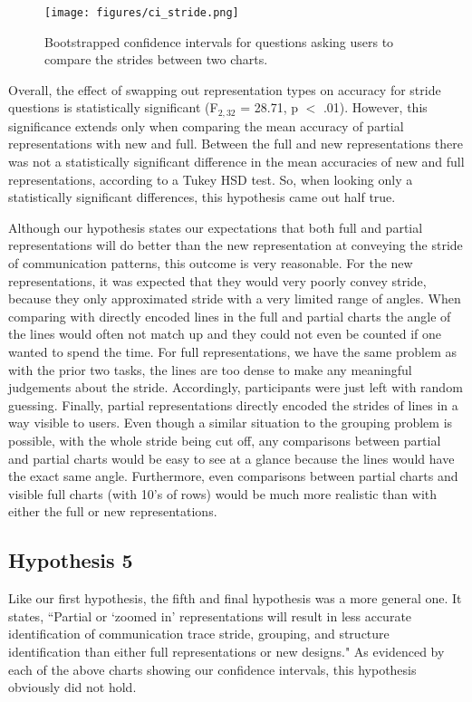     \begin{figure}
        \centering
        \texttt{[image: figures/ci\_stride.png]}
        \caption{Bootstrapped confidence intervals for questions asking users to compare the strides between two charts.}
        \label{fig:ci_stride}
    \end{figure}

    Overall, the effect of swapping out representation types on accuracy for stride questions is statistically significant (F$_{2,32}$ = 28.71, p $<$ .01). However, this significance extends only when comparing the mean accuracy of partial representations with new and full. Between the full and new representations there was not a statistically significant difference in the mean accuracies of new and full representations, according to a Tukey HSD test. So, when looking only a statistically significant differences, this hypothesis came out half true.
    
    Although our hypothesis states our expectations that both full and partial representations will do better than the new representation at conveying the stride of communication patterns, this outcome is very reasonable. For the new representations, it was expected that they would very poorly convey stride, because they only approximated stride with a very limited range of angles.  When comparing with directly encoded lines in the full and partial charts the angle of the lines would often not match up and they could not even be counted if one wanted to spend the time. For full representations, we have the same problem as with the prior two tasks, the lines are too dense to make any meaningful judgements about the stride. Accordingly, participants were just left with random guessing. Finally, partial representations directly encoded the strides of lines in a way visible to users. Even though a similar situation to the grouping problem is possible, with the whole stride being cut off, any comparisons between partial and partial charts would be easy to see at a glance because the lines would have the exact same angle. Furthermore, even comparisons between partial charts and visible full charts (with 10's of rows) would be much more realistic than with either the full or new representations.

\subsection{Hypothesis 5}
    Like our first hypothesis, the fifth and final hypothesis was a more general one. It states, ``Partial or `zoomed in' representations will result in less accurate identification of communication trace stride, grouping, and structure identification than either full representations or new designs." As evidenced by each of the above charts showing our confidence intervals, this hypothesis obviously did not hold. 
    
